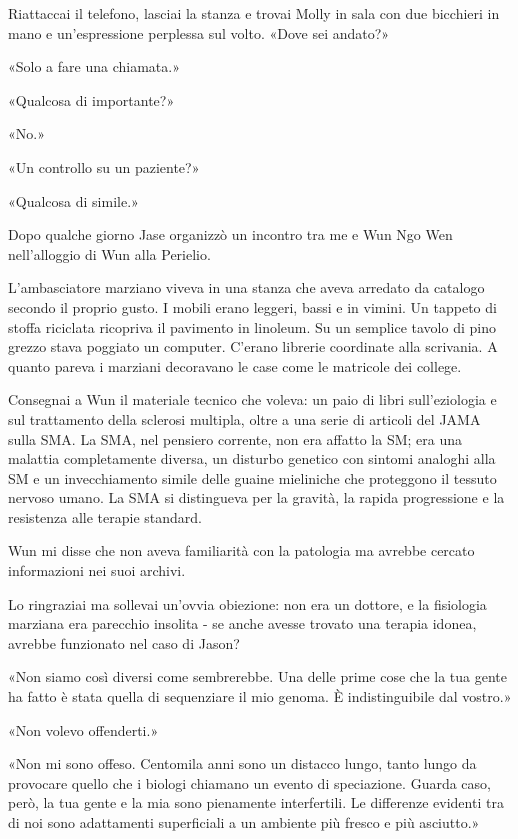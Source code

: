 Riattaccai il telefono, lasciai la stanza e trovai Molly in sala con due
bicchieri in mano e un'espressione perplessa sul volto. «Dove sei
andato?»

«Solo a fare una chiamata.»

«Qualcosa di importante?»

«No.»

«Un controllo su un paziente?»

«Qualcosa di simile.»

\separatorefiori

Dopo qualche giorno Jase organizzò un incontro tra me e Wun Ngo Wen
nell'alloggio di Wun alla Perielio.

L'ambasciatore marziano viveva in una stanza che aveva arredato da
catalogo secondo il proprio gusto. I mobili erano leggeri, bassi e in
vimini. Un tappeto di stoffa riciclata ricopriva il pavimento in
linoleum. Su un semplice tavolo di pino grezzo stava poggiato un
computer. C'erano librerie coordinate alla scrivania. A quanto pareva i
marziani decoravano le case come le matricole dei college.

Consegnai a Wun il materiale tecnico che voleva: un paio di libri
sull'eziologia e sul trattamento della sclerosi multipla, oltre a una
serie di articoli del JAMA sulla SMA. La SMA, nel pensiero corrente, non
era affatto la SM; era una malattia completamente diversa, un disturbo
genetico con sintomi analoghi alla SM e un invecchiamento simile delle
guaine mieliniche che proteggono il tessuto nervoso umano. La SMA si
distingueva per la gravità, la rapida progressione e la resistenza alle
terapie standard.

Wun mi disse che non aveva familiarità con la patologia ma avrebbe
cercato informazioni nei suoi archivi.

Lo ringraziai ma sollevai un'ovvia obiezione: non era un dottore, e la
fisiologia marziana era parecchio insolita - se anche avesse trovato una
terapia idonea, avrebbe funzionato nel caso di Jason?

«Non siamo così diversi come sembrerebbe. Una delle prime cose che la
tua gente ha fatto è stata quella di sequenziare il mio genoma. È
indistinguibile dal vostro.»

«Non volevo offenderti.»

«Non mi sono offeso. Centomila anni sono un distacco lungo, tanto lungo
da provocare quello che i biologi chiamano un evento di speciazione.
Guarda caso, però, la tua gente e la mia sono pienamente interfertili.
Le differenze evidenti tra di noi sono adattamenti superficiali a un
ambiente più fresco e più asciutto.»

